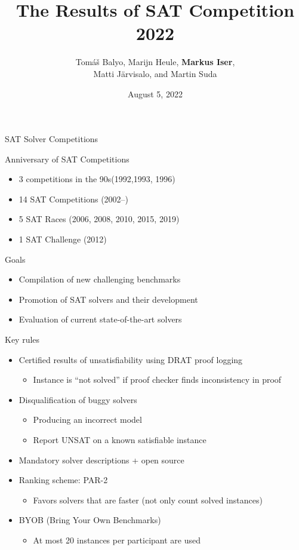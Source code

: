 \documentclass[trans]{beamer}
\title[SAT Competition 2022]{The Results of SAT Competition 2022}
\author[Balyo, Heule, Iser, J\"{a}rvisalo, Suda] {Tom{\'a}{\v s} Balyo, Marijn Heule,
{\bf Markus Iser},\\ Matti J\"{a}rvisalo, and Martin Suda}
\institute[] %
{
SAT 2022 Conference, Haifa (Israel) \\ %
}
\date{August 5, 2022} %
\begin{document}
\begin{frame}
\titlepage %
\end{frame}

\begin{frame}{SAT Solver Competitions}

\begin{block}{Anniversary of SAT Competitions}
\begin{itemize}
\item 3 competitions in the 90s\hfill (1992,1993, 1996)
\item 14 SAT Competitions \hfill (2002--)
\item 5 SAT Races \hfill (2006, 2008, 2010, 2015, 2019)
\item 1 SAT Challenge \hfill (2012)
\end{itemize}
\end{block}

\bigskip

\begin{block}{Goals}
\begin{itemize}
\item Compilation of new challenging benchmarks
\item Promotion of SAT solvers and their development
\item Evaluation of current state-of-the-art solvers
\end{itemize}
\end{block}

\end{frame}


\begin{frame}{Key rules}

\begin{itemize}
\item Certified results of unsatisfiability using DRAT proof logging
  \begin{itemize}
  \item Instance is ``not solved'' if proof checker finds inconsistency in proof
  \end{itemize}
\medskip
\item Disqualification of buggy solvers
  \begin{itemize}
  \item Producing an incorrect model
  \item Report UNSAT on a known satisfiable instance
  \end{itemize}
\medskip
\item Mandatory solver descriptions + open source
\medskip
\item Ranking scheme: PAR-2
\begin{itemize}
\item Favors solvers that are faster (not only count solved instances)
\end{itemize}
\medskip
\item BYOB (Bring Your Own Benchmarks)
\begin{itemize}
\item At most 20 instances per participant are used
\end{itemize} 
\end{itemize}

\end{frame}
\end{document}
